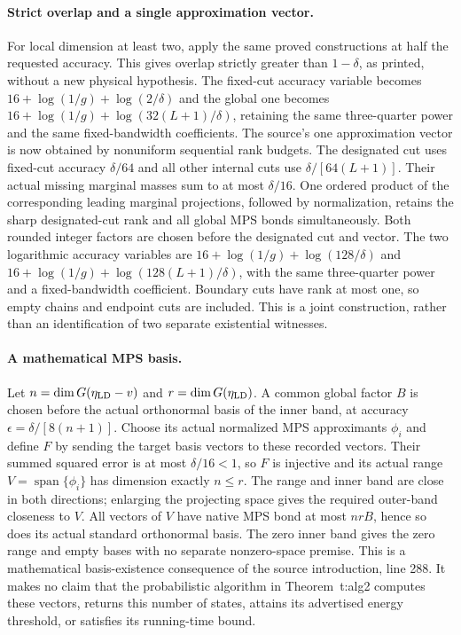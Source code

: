 \documentclass{article}
\begin{document}
\paragraph{Strict overlap and a single approximation vector.}
For local dimension at least two, apply the same proved constructions at
half the requested accuracy. This gives overlap strictly greater than
$1-\delta$, as printed, without a new physical hypothesis. The fixed-cut
accuracy variable becomes $16+\log(1/g)+\log(2/\delta)$ and the global
one becomes $16+\log(1/g)+\log(32(L+1)/\delta)$, retaining the same
three-quarter power and the same fixed-bandwidth coefficients.
The source's one approximation vector is now obtained by nonuniform
sequential rank budgets. The designated cut uses fixed-cut accuracy
$\delta/64$ and all other internal cuts use $\delta/[64(L+1)]$.
Their actual missing marginal masses sum to at most $\delta/16$.
One ordered product of the corresponding leading marginal projections,
followed by normalization, retains the sharp designated-cut rank and
all global MPS bonds simultaneously. Both rounded integer factors are
chosen before the designated cut and vector. The two logarithmic
accuracy variables are $16+\log(1/g)+\log(128/\delta)$ and
$16+\log(1/g)+\log(128(L+1)/\delta)$, with the same three-quarter
power and a fixed-bandwidth coefficient. Boundary cuts have rank at
most one, so empty chains and endpoint cuts are included. This is a
joint construction, rather than an identification of two separate
existential witnesses.

\paragraph{A mathematical MPS basis.}
Let $n=\dim G(\eta_{\rm LD}-v)$ and $r=\dim G(\eta_{\rm LD})$.
A common global factor $B$ is chosen before the actual orthonormal basis
of the inner band, at accuracy $\epsilon=\delta/[8(n+1)]$.
Choose its actual normalized MPS approximants $\phi_i$ and define $F$
by sending the target basis vectors to these recorded vectors.
Their summed squared error is at most $\delta/16<1$, so $F$ is
injective and its actual range $V=\operatorname{span}\{\phi_i\}$
has dimension exactly $n\le r$. The range and inner band are close in
both directions; enlarging the projecting space gives the required
outer-band closeness to $V$. All vectors of $V$ have native MPS bond
at most $nrB$, hence so does its actual standard orthonormal basis.
The zero inner band gives the zero range and empty bases with no
separate nonzero-space premise. This is a mathematical basis-existence
consequence of the source introduction, line 288. It makes no claim that
the probabilistic algorithm in Theorem~t:alg2 computes these vectors,
returns this number of states, attains its advertised energy threshold,
or satisfies its running-time bound.
\end{document}
